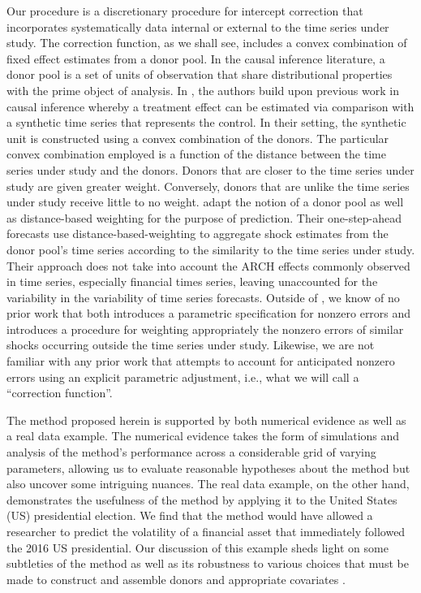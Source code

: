 \documentclass{uiucthesis2021}
\theoremstyle{definition}
\begin{document}
Our procedure is a discretionary procedure for intercept correction that  incorporates systematically data internal or external to the time series under study.  The correction function, as we shall see, includes a convex combination of fixed effect estimates from a donor pool.  In  the causal inference literature, a donor pool is a set of units of observation that share distributional properties with the prime object of analysis.  In \cite[][]{abadie2010synthetic}, the authors build upon previous work in causal inference whereby a treatment effect can be estimated via comparison with a synthetic time series that represents the control.  In their setting, the synthetic unit is constructed using a convex combination of the donors.  The particular convex combination employed is a function of the distance between the time series under study and the donors.  Donors that are closer to the time series under study are given greater weight.  Conversely, donors that are unlike the time series under study receive little to no weight.  \cite[][]{lin2021minimizing} adapt the notion of a donor pool as well as distance-based weighting for the purpose of prediction.  Their one-step-ahead forecasts use distance-based-weighting to aggregate shock estimates from the donor pool's time series according to the similarity to the time series under study.  Their approach does not take into account the ARCH effects commonly observed in time series, especially financial times series, leaving unaccounted for the variability in the variability of time series forecasts.  Outside of \cite[][]{lin2021minimizing}, we know of no prior work that both introduces a parametric specification for nonzero errors and introduces a procedure for weighting appropriately the nonzero errors of similar shocks occurring outside the time series under study.  Likewise, we are not familiar with any prior work that attempts to account for anticipated nonzero errors using an explicit parametric adjustment, i.e., what we will call a ``correction function''.  

The method proposed herein is supported by both numerical evidence as well as a real data example.  The numerical evidence takes the form of simulations and analysis of the method's performance across a considerable grid of varying parameters, allowing us to evaluate reasonable hypotheses about the method but also uncover some intriguing nuances.  The real data example, on the other hand, demonstrates the usefulness of the method by applying it to the United States (US) presidential election.  We find that the method would have allowed a researcher to predict the volatility of a financial asset that immediately followed the 2016 US presidential.  Our discussion of this example sheds light on some subtleties of the method as well as its robustness to various choices that must be made to construct and assemble donors and appropriate covariates \parencite[][]{steegen2016increasing}.
\end{document}
